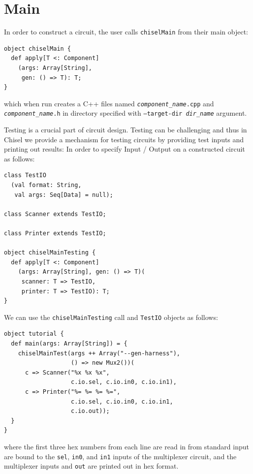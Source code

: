 \documentclass[10pt,twocolumn]{article}
\def\code#1{{\small\tt #1}}
\begin{document}
\section{Main}

In order to construct a circuit, 
the user calls \code{chiselMain} from their main object:

\begin{lstlisting}
object chiselMain {
  def apply[T <: Component]
    (args: Array[String], 
     gen: () => T): T;
}
\end{lstlisting}

\noindent
which when run creates a C++ files named
\code{{\it component\_name}.cpp} and \code{{\it component\_name}.h} in directory specified with
\code{--target-dir {\it dir\_name}} argument.

Testing is a crucial part of circuit design.
Testing can be challenging and thus in Chisel we provide a mechanism for
testing circuits by providing test inputs and printing out results:
In order to specify Input / Output on a constructed circuit as follows:

\begin{lstlisting}
class TestIO
  (val format: String, 
   val args: Seq[Data] = null);

class Scanner extends TestIO;

class Printer extends TestIO;

object chiselMainTesting {
  def apply[T <: Component]
    (args: Array[String], gen: () => T)(
     scanner: T => TestIO, 
     printer: T => TestIO): T;
}
\end{lstlisting}

\noindent

We can use the \code{chiselMainTesting} call and \code{TestIO} objects as follows:

\begin{lstlisting}
object tutorial {
  def main(args: Array[String]) = {
    chiselMainTest(args ++ Array("--gen-harness"), 
                   () => new Mux2())(
      c => Scanner("%x %x %x", 
                   c.io.sel, c.io.in0, c.io.in1),
      c => Printer("%= %= %= %=", 
                   c.io.sel, c.io.in0, c.io.in1, 
                   c.io.out));
  }
}
\end{lstlisting}

\noindent
where the first three hex numbers from each line are read in from
standard input are bound to the \code{sel}, \code{in0},  and
\code{in1} inputs of the multiplexer circuit, and the multiplexer
inputs and \code{out} are printed out in hex format.  
\end{document}
